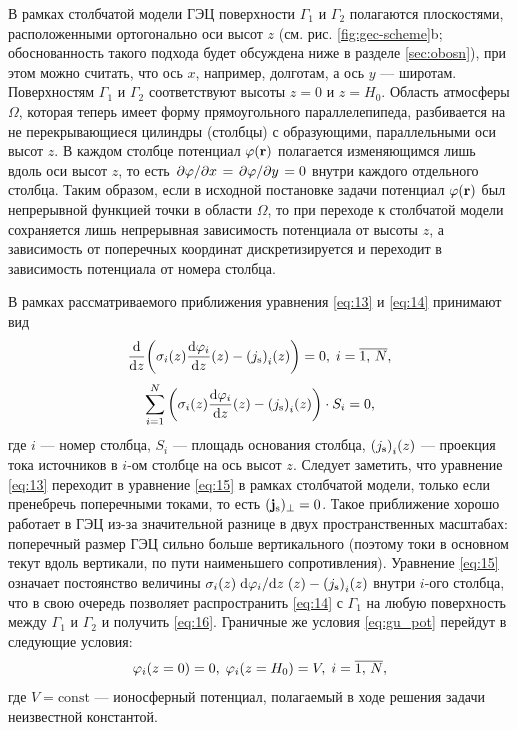 В рамках столбчатой модели ГЭЦ поверхности $\Gamma_1$ и $\Gamma_2$ полагаются плоскостями, расположенными ортогонально оси высот $z$ (см. рис. \ref{fig:gec-scheme}{b}; обоснованность такого подхода будет обсуждена ниже в разделе \ref{sec:obosn}), при этом можно считать, что ось $x$, например, долготам, а ось $y$ --- широтам. Поверхностям $\Gamma_1$ и $\Gamma_2$ соответствуют высоты $z=0$ и $z=H_0$. Область атмосферы $\Omega$, которая теперь имеет форму прямоугольного параллелепипеда, разбивается на не перекрывающиеся цилиндры (столбцы) с образующими, параллельными оси высот $z$. В каждом столбце потенциал $\varphi(\vb{r})$ полагается изменяющимся лишь вдоль оси высот $z$, то есть $\pdv*{\varphi}{x} = \pdv*{\varphi}{y} = 0$ внутри каждого отдельного столбца. Таким образом, если в исходной постановке задачи потенциал $\varphi(\vb{r})$ был непрерывной функцией точки в области $\Omega$, то при переходе к столбчатой модели сохраняется лишь непрерывная зависимость потенциала от высоты $z$, а зависимость от поперечных координат дискретизируется и переходит в зависимость потенциала от номера столбца.

В рамках рассматриваемого приближения уравнения \eqref{eq:13} и \eqref{eq:14} принимают вид
\begin{equation}
    \dv{z}\qty(\sigma_i(z)\dv{\varphi_i}{z}\qty(z) - \qty(j_\mathrm{s})_i\qty(z)) = 0,\; i=\overline{1,\, N},
    \label{eq:15}
\end{equation}
\begin{equation}
    \sum\limits_{i=1}^{N} \qty(\sigma_i(z)\dv{\varphi_i}{z}\qty(z) - \qty(j_\mathrm{s})_i\qty(z))\cdot S_i = 0,
    \label{eq:16}
\end{equation}
где $i$ --- номер столбца, $S_i$ --- площадь основания столбца, $\qty(j_\mathrm{s})_i\qty(z)$ --- проекция тока источников в $i$-ом столбце на ось высот $z$. Следует заметить, что уравнение \eqref{eq:13} переходит в уравнение \eqref{eq:15} в рамках столбчатой модели, только если пренебречь поперечными токами, то есть $(\vb{j}_\mathrm{s})_{\perp} = 0$. Такое приближение хорошо работает в ГЭЦ из-за значительной разнице в двух пространственных масштабах: поперечный размер ГЭЦ сильно больше вертикального (поэтому токи в основном текут вдоль вертикали, по пути наименьшего сопротивления). Уравнение \eqref{eq:15} означает постоянство величины $\sigma_i(z)\dv*{\varphi_i}{z}\qty(z) - \qty(j_\mathrm{s})_i\qty(z)$ внутри $i$-ого столбца, что в свою очередь позволяет распространить \eqref{eq:14} с $\Gamma_1$ на любую поверхность между $\Gamma_1$ и $\Gamma_2$ и получить \eqref{eq:16}. Граничные же условия \eqref{eq:gu_pot} перейдут в следующие условия:
\begin{equation}
    \varphi_i\qty(z=0) = 0,\;  \varphi_i\qty(z=H_0) = V,\; i=\overline{1,\, N},
    \label{eq:gu_pot_stolb}
\end{equation}
где $V = \mathrm{const}$ --- ионосферный потенциал, полагаемый в ходе решения задачи неизвестной константой.

